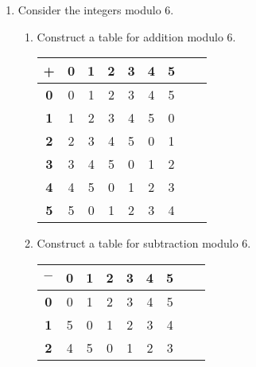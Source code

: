 \documentclass{article}
\begin{document}
\begin{enumerate}
      \item Consider the integers modulo 6.
            \begin{enumerate}
                  \item Construct a table for addition modulo 6.\\
                        \begin{tabular}{c|c|c|c|c|c|c|c|c}
                              \textbf{+} & \textbf{0} & \textbf{1} & \textbf{2} & \textbf{3} & \textbf{4} & \textbf{5} \\ \hline
                              \textbf{0} & 0          & 1          & 2          & 3          & 4          & 5          \\ \hline
                              \textbf{1} & 1          & 2          & 3          & 4          & 5          & 0          \\ \hline
                              \textbf{2} & 2          & 3          & 4          & 5          & 0          & 1          \\ \hline
                              \textbf{3} & 3          & 4          & 5          & 0          & 1          & 2          \\ \hline
                              \textbf{4} & 4          & 5          & 0          & 1          & 2          & 3          \\ \hline
                              \textbf{5} & 5          & 0          & 1          & 2          & 3          & 4          \\ \hline
                        \end{tabular}
                  \item Construct a table for subtraction modulo 6.\\
                        \begin{tabular}{c|c|c|c|c|c|c|c|c}
                              $-$        & \textbf{0} & \textbf{1} & \textbf{2} & \textbf{3} & \textbf{4} & \textbf{5} \\ \hline
                              \textbf{0} & 0          & 1          & 2          & 3          & 4          & 5          \\ \hline
                              \textbf{1} & 5          & 0          & 1          & 2          & 3          & 4          \\ \hline
                              \textbf{2} & 4          & 5          & 0          & 1          & 2          & 3          \\ \hline

\end{tabular}
\end{enumerate}
\end{enumerate}
\end{document}

